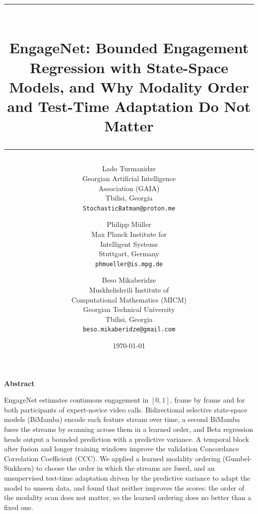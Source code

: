 \documentclass[10pt,a4paper,twocolumn]{article}
\renewenvironment{abstract}{\par\centerline{\bfseries Abstract}\par\vspace{0.3em}}{\par\vspace{0.5em}}
\begin{document}
	
	\title{\rule{\linewidth}{1.5pt}\\[0.6em]\textbf{EngageNet: Bounded Engagement Regression with State-Space Models, and Why Modality Order and Test-Time Adaptation Do Not Matter}\\[0.2em]\rule{\linewidth}{1.5pt}}
	\author{Lado Turmanidze\\ \footnotesize Georgian Artificial Intelligence\\ \footnotesize Association (GAIA)\\ \footnotesize Tbilisi, Georgia\\ \footnotesize \texttt{StochasticBatman@proton.me}
	\and Philipp M\"uller\\ \footnotesize Max Planck Institute for\\ \footnotesize Intelligent Systems\\ \footnotesize Stuttgart, Germany\\ \footnotesize \texttt{phmueller@is.mpg.de}
	\and Beso Mikaberidze\\ \footnotesize Muskhelishvili Institute of\\ \footnotesize Computational Mathematics (MICM)\\ \footnotesize Georgian Technical University\\ \footnotesize Tbilisi, Georgia\\ \footnotesize \texttt{beso.mikaberidze@gmail.com}}
	\date{\today}
	\maketitle
	
	\begin{abstract}
	    EngageNet estimates continuous engagement in $[0,1]$, frame by frame and for both participants of expert-novice video calls. Bidirectional selective state-space models (BiMamba) encode each feature stream over time, a second BiMamba fuses the streams by scanning across them in a learned order, and Beta regression heads output a bounded prediction with a predictive variance. A temporal block after fusion and longer training windows improve the validation Concordance Correlation Coefficient (CCC). We applied a learned modality ordering (Gumbel-Sinkhorn) to choose the order in which the streams are fused, and an unsupervised test-time adaptation driven by the predictive variance to adapt the model to unseen data, and found that neither improves the scores: the order of the modality scan does not matter, so the learned ordering does no better than a fixed one.
	\end{abstract}
\end{document}
